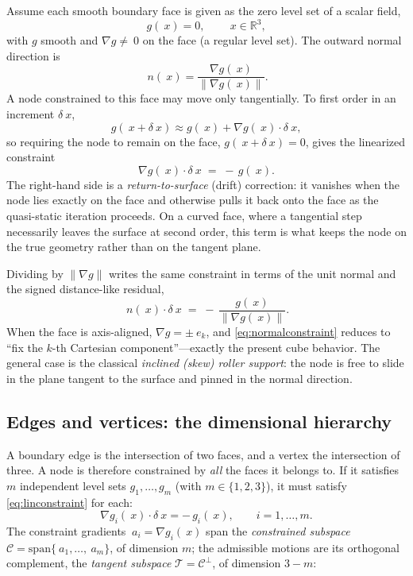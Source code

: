 \documentclass[11pt]{article}
\newcommand{\grad}{\nabla}
\newcommand{\Real}{\mathbb{R}}
\newcommand{\norm}[1]{\lVert #1 \rVert}
\begin{document}
Assume each smooth boundary face is given as the zero level set of a scalar
field,
\begin{equation}
  g(~x) = 0, \qquad ~x \in \Real^3,
  \label{eq:levelset}
\end{equation}
with $g$ smooth and $\grad g \ne ~0$ on the face (a regular level set). The
outward normal direction is
\begin{equation}
  ~n(~x) = \frac{\grad g(~x)}{\norm{\grad g(~x)}}.
  \label{eq:normal}
\end{equation}
A node constrained to this face may move only tangentially. To first order in
an increment $\delta~x$,
\begin{equation}
  g(~x + \delta~x) \approx g(~x) + \grad g(~x)\cdot\delta~x,
\end{equation}
so requiring the node to remain on the face, $g(~x+\delta~x)=0$, gives the
linearized constraint
\begin{equation}
  \grad g(~x)\cdot\delta~x \;=\; -\,g(~x).
  \label{eq:linconstraint}
\end{equation}
The right-hand side is a \emph{return-to-surface} (drift) correction: it
vanishes when the node lies exactly on the face and otherwise pulls it back
onto the face as the quasi-static iteration proceeds. On a curved face, where a
tangential step necessarily leaves the surface at second order, this term is
what keeps the node on the true geometry rather than on the tangent plane.

Dividing by $\norm{\grad g}$ writes the same constraint in terms of the unit
normal and the signed distance-like residual,
\begin{equation}
  ~n(~x)\cdot\delta~x \;=\; -\,\frac{g(~x)}{\norm{\grad g(~x)}}.
  \label{eq:normalconstraint}
\end{equation}
When the face is axis-aligned, $\grad g = \pm~e_k$, and
\eqref{eq:normalconstraint} reduces to ``fix the $k$-th Cartesian
component''---exactly the present cube behavior. The general case is the
classical \emph{inclined (skew) roller support}: the node is free to slide in
the plane tangent to the surface and pinned in the normal direction.

\subsection{Edges and vertices: the dimensional hierarchy}

A boundary edge is the intersection of two faces, and a vertex the intersection
of three. A node is therefore constrained by \emph{all} the faces it belongs
to. If it satisfies $m$ independent level sets $g_1,\dots,g_m$ (with
$m\in\{1,2,3\}$), it must satisfy \eqref{eq:linconstraint} for each:
\begin{equation}
  \grad g_i(~x)\cdot\delta~x = -\,g_i(~x), \qquad i = 1,\dots,m.
  \label{eq:multiconstraint}
\end{equation}
The constraint gradients $~a_i = \grad g_i(~x)$ span the \emph{constrained
subspace} $\mathcal{C} = \mathrm{span}\{~a_1,\dots,~a_m\}$, of dimension $m$;
the admissible motions are its orthogonal complement, the \emph{tangent
subspace} $\mathcal{T} = \mathcal{C}^\perp$, of dimension $3-m$:
\end{document}
